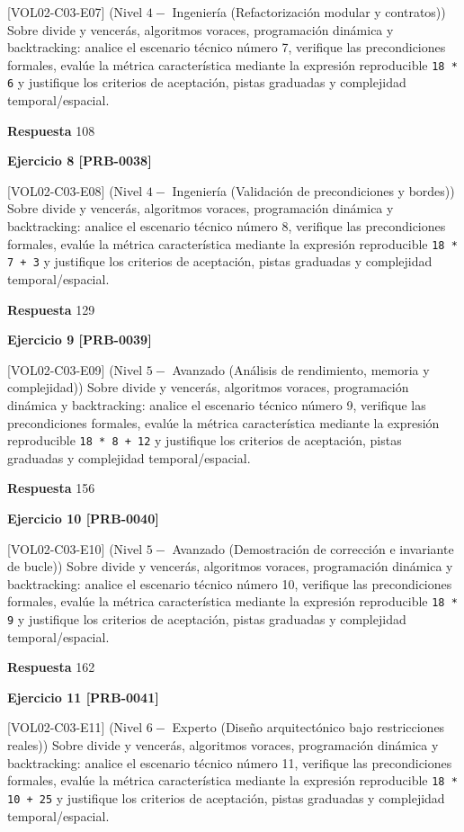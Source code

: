 \documentclass{book}
\begin{document}
[VOL02-C03-E07] (Nivel \(4 -\) Ingeniería (Refactorización modular y contratos)) Sobre divide y vencerás, algoritmos voraces, programación dinámica y backtracking: analice el escenario técnico número 7, verifique las precondiciones formales, evalúe la métrica característica mediante la expresión reproducible \texttt{18 * 6} y justifique los criterios de aceptación, pistas graduadas y complejidad temporal/espacial.

\noindent\textbf{Respuesta} 108

\noindent\textbf{Ejercicio 8 [PRB-0038]}

[VOL02-C03-E08] (Nivel \(4 -\) Ingeniería (Validación de precondiciones y bordes)) Sobre divide y vencerás, algoritmos voraces, programación dinámica y backtracking: analice el escenario técnico número 8, verifique las precondiciones formales, evalúe la métrica característica mediante la expresión reproducible \texttt{18 * 7 + 3} y justifique los criterios de aceptación, pistas graduadas y complejidad temporal/espacial.

\noindent\textbf{Respuesta} 129

\noindent\textbf{Ejercicio 9 [PRB-0039]}

[VOL02-C03-E09] (Nivel \(5 -\) Avanzado (Análisis de rendimiento, memoria y complejidad)) Sobre divide y vencerás, algoritmos voraces, programación dinámica y backtracking: analice el escenario técnico número 9, verifique las precondiciones formales, evalúe la métrica característica mediante la expresión reproducible \texttt{18 * 8 + 12} y justifique los criterios de aceptación, pistas graduadas y complejidad temporal/espacial.

\noindent\textbf{Respuesta} 156

\noindent\textbf{Ejercicio 10 [PRB-0040]}

[VOL02-C03-E10] (Nivel \(5 -\) Avanzado (Demostración de corrección e invariante de bucle)) Sobre divide y vencerás, algoritmos voraces, programación dinámica y backtracking: analice el escenario técnico número 10, verifique las precondiciones formales, evalúe la métrica característica mediante la expresión reproducible \texttt{18 * 9} y justifique los criterios de aceptación, pistas graduadas y complejidad temporal/espacial.

\noindent\textbf{Respuesta} 162

\noindent\textbf{Ejercicio 11 [PRB-0041]}

[VOL02-C03-E11] (Nivel \(6 -\) Experto (Diseño arquitectónico bajo restricciones reales)) Sobre divide y vencerás, algoritmos voraces, programación dinámica y backtracking: analice el escenario técnico número 11, verifique las precondiciones formales, evalúe la métrica característica mediante la expresión reproducible \texttt{18 * 10 + 25} y justifique los criterios de aceptación, pistas graduadas y complejidad temporal/espacial.
\end{document}
